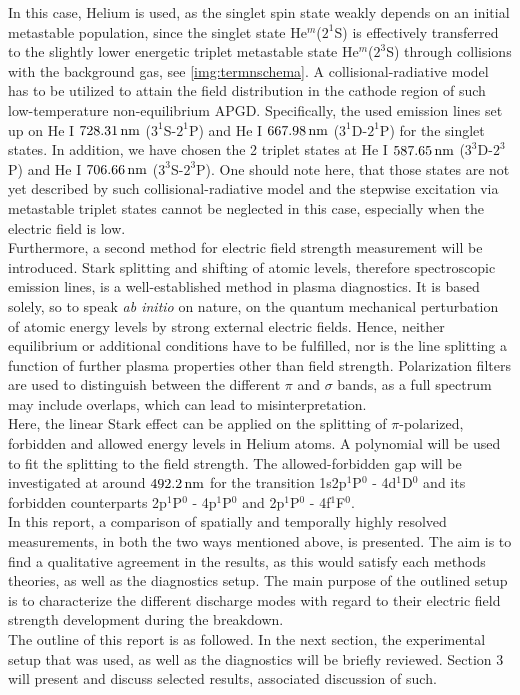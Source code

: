 \documentclass[a4paper,10pt,twoside]{article}
\newcommand{\tilt}[1]{\textit{#1}}
\begin{document}
		In this case, Helium is used, as the singlet spin state weakly depends on an initial metastable population, since the singlet state He$^m$($2^1$S) is effectively transferred to the slightly lower energetic triplet metastable state He$^m$($2^3$S) through collisions with the background gas, see \autoref{img:termnschema}. A collisional-radiative model has to be utilized to attain the field distribution in the cathode region of such low-temperature non-equilibrium APGD. Specifically, the used emission lines set up on He I $\unit[728.31]{nm}$ ($3^1$S-$2^1$P) and He I $\unit[667.98]{nm}$ ($3^1$D-$2^1$P) for the singlet states. In addition, we have chosen the 2 triplet states at He I $\unit[587.65]{nm}$ ($3^3$D-$2^3$P) and He I $\unit[706.66]{nm}$ ($3^3$S-$2^3$P). One should note here, that those states are not yet described by such collisional-radiative model and the stepwise excitation via metastable triplet states cannot be neglected in this case, especially when the electric field is low.\\
		Furthermore, a second method for electric field \linebreak strength measurement will be introduced. Stark splitting and shifting of atomic levels, therefore spectroscopic emission lines, is a well-established method in plasma diagnostics. It is based solely, so to speak \tilt{ab initio} on nature, on the quantum mechanical perturbation of atomic energy levels by strong external electric fields. Hence, neither equilibrium or additional conditions have to be fulfilled, nor is the line splitting a function of further plasma properties other than field strength. Polarization filters are used to distinguish between the different $\pi$ and $\sigma$ bands, as a full spectrum may include overlaps, which can lead to misinterpretation.\\
		Here, the linear Stark effect can be applied on the splitting of $\pi$-polarized, forbidden and allowed energy levels in Helium atoms. A polynomial will be used to fit the splitting to the field strength. The allowed-forbidden gap will be investigated at around $\unit[492.2]{nm}$ for the transition 1s2p$^1$P$^0$ - 4d$^1$D$^0$ and its forbidden counterparts 2p$^1$P$^0$ - 4p$^1$P$^0$ and 2p$^1$P$^0$ - 4f$^1$F$^0$.\\
		In this report, a comparison of spatially and temporally highly resolved measurements, in both the two ways mentioned above, is presented. The aim is to find a qualitative agreement in the results, as this would satisfy each methods theories, as well as the diagnostics setup. The main purpose of the outlined setup is to characterize the different discharge modes with regard to their electric field strength development during the breakdown.\\
		The outline of this report is as followed. In the next section, the experimental setup that was used, as well as the diagnostics will be briefly reviewed. Section 3 will present and discuss selected results, associated discussion of such.
\end{document}
